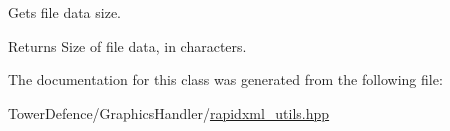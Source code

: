 Gets file data size. \begin{DoxyReturn}{Returns}
Size of file data, in characters. 
\end{DoxyReturn}


The documentation for this class was generated from the following file\+:\begin{DoxyCompactItemize}
\item 
Tower\+Defence/\+Graphics\+Handler/\mbox{\hyperlink{rapidxml__utils_8hpp}{rapidxml\+\_\+utils.\+hpp}}\end{DoxyCompactItemize}
